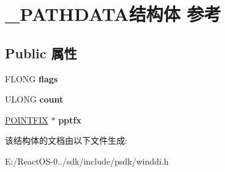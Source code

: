 \hypertarget{struct___p_a_t_h_d_a_t_a}{}\section{\+\_\+\+P\+A\+T\+H\+D\+A\+T\+A结构体 参考}
\label{struct___p_a_t_h_d_a_t_a}
\subsection*{Public 属性}
\begin{DoxyCompactItemize}
\item 
\mbox{\label{struct___p_a_t_h_d_a_t_a_aba25da6ea94aa874ae99f534317753fa}} 
F\+L\+O\+NG {\bfseries flags}
\item 
\mbox{\label{struct___p_a_t_h_d_a_t_a_ad341c41c2b1e59635aad60c4a2e9635c}} 
U\+L\+O\+NG {\bfseries count}
\item 
\mbox{\label{struct___p_a_t_h_d_a_t_a_acef06051d8eeb9e1cdd78da104a06154}} 
\hyperlink{struct___p_o_i_n_t_f_i_x}{P\+O\+I\+N\+T\+F\+IX} $\ast$ {\bfseries pptfx}
\end{DoxyCompactItemize}


该结构体的文档由以下文件生成\+:\begin{DoxyCompactItemize}
\item 
E\+:/\+React\+O\+S-\/0../sdk/include/psdk/winddi.\+h\end{DoxyCompactItemize}
